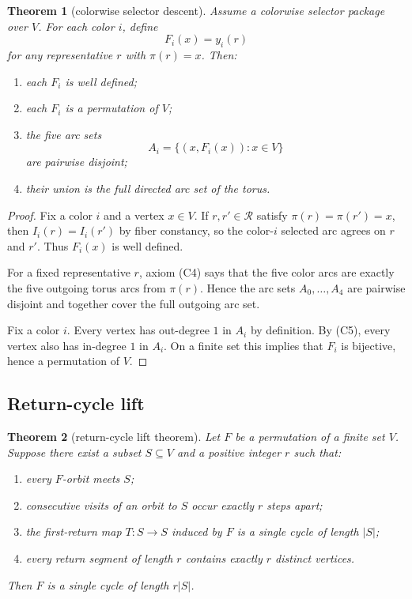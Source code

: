 \documentclass[11pt]{article}
\newtheorem{theorem}{Theorem}[section]
\newcommand{\Rm}{\mathcal R}
\begin{document}
\begin{theorem}[colorwise selector descent]
\label{thm:colorwise-selector-descent}
Assume a colorwise selector package over $V$.
For each color $i$, define
\[
F_i(x)=y_i(r)
\]
for any representative $r$ with $\pi(r)=x$.
Then:
\begin{enumerate}[label=\textup{(\alph*)},leftmargin=2.5em]
\item each $F_i$ is well defined;
\item each $F_i$ is a permutation of $V$;
\item the five arc sets
      \[
      A_i=\{(x,F_i(x)):x\in V\}
      \]
      are pairwise disjoint;
\item their union is the full directed arc set of the torus.
\end{enumerate}
\end{theorem}

\begin{proof}
Fix a color $i$ and a vertex $x\in V$.
If $r,r'\in\Rm$ satisfy $\pi(r)=\pi(r')=x$, then $I_i(r)=I_i(r')$ by fiber
constancy, so the color-$i$ selected arc agrees on $r$ and $r'$.
Thus $F_i(x)$ is well defined.

For a fixed representative $r$, axiom \textup{(C4)} says that the five color
arcs are exactly the five outgoing torus arcs from $\pi(r)$.
Hence the arc sets $A_0,\dots,A_4$ are pairwise disjoint and together cover the
full outgoing arc set.

Fix a color $i$.
Every vertex has out-degree $1$ in $A_i$ by definition.
By \textup{(C5)}, every vertex also has in-degree $1$ in $A_i$.
On a finite set this implies that $F_i$ is bijective, hence a permutation of
$V$.
\end{proof}

\subsection{Return-cycle lift}

\begin{theorem}[return-cycle lift theorem]
\label{thm:return-cycle-lift}
Let $F$ be a permutation of a finite set $V$.
Suppose there exist a subset $S\subseteq V$ and a positive integer $r$ such
that:
\begin{enumerate}[label=\textup{(R\arabic*)},leftmargin=2.8em]
\item every $F$-orbit meets $S$;
\item consecutive visits of an orbit to $S$ occur exactly $r$ steps apart;
\item the first-return map $T:S\to S$ induced by $F$ is a single cycle of
      length $|S|$;
\item every return segment of length $r$ contains exactly $r$ distinct
      vertices.
\end{enumerate}
Then $F$ is a single cycle of length $r|S|$.
\end{theorem}
\end{document}
